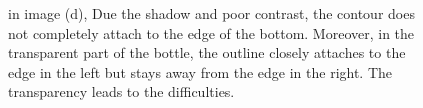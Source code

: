 \begin{figure}[htbp] 
  \begin{minipage}[t]{0.5\linewidth} 
    \centering 
  \end{minipage}%
  \begin{minipage}[t]{0.5\linewidth} 
    \centering 
  \end{minipage} 
  \begin{minipage}[t]{0.5\linewidth} 
    \centering 
  \end{minipage} 
  \begin{minipage}[t]{0.5\linewidth} 
    \centering 
  \end{minipage} 
\caption[Segmentation of a transparent bottle]{in image (d), Due the shadow and poor
contrast, the contour does not completely attach to the edge of the
bottom. Moreover, in the transparent part of the bottle, the outline
closely attaches to the edge in the left but stays away from the edge
in the right. The transparency leads to the difficulties. }
\label{fig:cola}
\end{figure}
